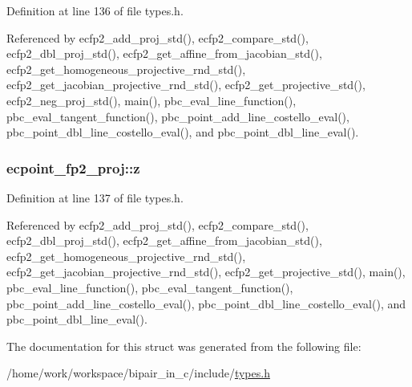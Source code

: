 Definition at line 136 of file types.\-h.



Referenced by ecfp2\-\_\-add\-\_\-proj\-\_\-std(), ecfp2\-\_\-compare\-\_\-std(), ecfp2\-\_\-dbl\-\_\-proj\-\_\-std(), ecfp2\-\_\-get\-\_\-affine\-\_\-from\-\_\-jacobian\-\_\-std(), ecfp2\-\_\-get\-\_\-homogeneous\-\_\-projective\-\_\-rnd\-\_\-std(), ecfp2\-\_\-get\-\_\-jacobian\-\_\-projective\-\_\-rnd\-\_\-std(), ecfp2\-\_\-get\-\_\-projective\-\_\-std(), ecfp2\-\_\-neg\-\_\-proj\-\_\-std(), main(), pbc\-\_\-eval\-\_\-line\-\_\-function(), pbc\-\_\-eval\-\_\-tangent\-\_\-function(), pbc\-\_\-point\-\_\-add\-\_\-line\-\_\-costello\-\_\-eval(), pbc\-\_\-point\-\_\-dbl\-\_\-line\-\_\-costello\-\_\-eval(), and pbc\-\_\-point\-\_\-dbl\-\_\-line\-\_\-eval().

\hypertarget{structecpoint__fp2__proj_abcf8159983dfa823b8db342f5fca2d4d}{
\subsubsection[{z}]{ ecpoint\-\_\-fp2\-\_\-proj\-::z}}\label{structecpoint__fp2__proj_abcf8159983dfa823b8db342f5fca2d4d}


Definition at line 137 of file types.\-h.



Referenced by ecfp2\-\_\-add\-\_\-proj\-\_\-std(), ecfp2\-\_\-compare\-\_\-std(), ecfp2\-\_\-dbl\-\_\-proj\-\_\-std(), ecfp2\-\_\-get\-\_\-affine\-\_\-from\-\_\-jacobian\-\_\-std(), ecfp2\-\_\-get\-\_\-homogeneous\-\_\-projective\-\_\-rnd\-\_\-std(), ecfp2\-\_\-get\-\_\-jacobian\-\_\-projective\-\_\-rnd\-\_\-std(), ecfp2\-\_\-get\-\_\-projective\-\_\-std(), main(), pbc\-\_\-eval\-\_\-line\-\_\-function(), pbc\-\_\-eval\-\_\-tangent\-\_\-function(), pbc\-\_\-point\-\_\-add\-\_\-line\-\_\-costello\-\_\-eval(), pbc\-\_\-point\-\_\-dbl\-\_\-line\-\_\-costello\-\_\-eval(), and pbc\-\_\-point\-\_\-dbl\-\_\-line\-\_\-eval().



The documentation for this struct was generated from the following file\-:\begin{DoxyCompactItemize}
\item 
/home/work/workspace/bipair\-\_\-in\-\_\-c/include/\hyperlink{types_8h}{types.\-h}\end{DoxyCompactItemize}
